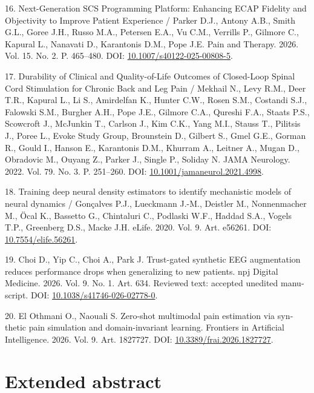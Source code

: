 \documentclass[12pt,a4paper]{article}
\begin{document}
\noindent\foreignlanguage{english}{16. Next-Generation SCS Programming Platform: Enhancing ECAP Fidelity and Objectivity to Improve Patient Experience / Parker D.J., Antony A.B., Smith G.L., Goree J.H., Russo M.A., Petersen E.A., Vu C.M., Verrills P., Gilmore C., Kapural L., Nanavati D., Karantonis D.M., Pope J.E. Pain and Therapy. 2026. Vol. 15. No. 2. P. 465–480. DOI: \url{10.1007/s40122-025-00808-5}.}\par
\noindent\foreignlanguage{english}{17. Durability of Clinical and Quality-of-Life Outcomes of Closed-Loop Spinal Cord Stimulation for Chronic Back and Leg Pain / Mekhail N., Levy R.M., Deer T.R., Kapural L., Li S., Amirdelfan K., Hunter C.W., Rosen S.M., Costandi S.J., Falowski S.M., Burgher A.H., Pope J.E., Gilmore C.A., Qureshi F.A., Staats P.S., Scowcroft J., McJunkin T., Carlson J., Kim C.K., Yang M.I., Stauss T., Pilitsis J., Poree L., Evoke Study Group, Brounstein D., Gilbert S., Gmel G.E., Gorman R., Gould I., Hanson E., Karantonis D.M., Khurram A., Leitner A., Mugan D., Obradovic M., Ouyang Z., Parker J., Single P., Soliday N. JAMA Neurology. 2022. Vol. 79. No. 3. P. 251–260. DOI: \url{10.1001/jamaneurol.2021.4998}.}\par
\noindent\foreignlanguage{english}{18. Training deep neural density estimators to identify mechanistic models of neural dynamics / Gonçalves P.J., Lueckmann J.-M., Deistler M., Nonnenmacher M., Öcal K., Bassetto G., Chintaluri C., Podlaski W.F., Haddad S.A., Vogels T.P., Greenberg D.S., Macke J.H. eLife. 2020. Vol. 9. Art. e56261. DOI: \url{10.7554/elife.56261}.}\par
\noindent\foreignlanguage{english}{19. Choi D., Yip C., Choi A., Park J. Trust-gated synthetic EEG augmentation reduces performance drops when generalizing to new patients. npj Digital Medicine. 2026. Vol. 9. No. 1. Art. 634. Reviewed text: accepted unedited manuscript. DOI: \url{10.1038/s41746-026-02778-0}.}\par
\noindent\foreignlanguage{english}{20. El Othmani O., Naouali S. Zero-shot multimodal pain estimation via synthetic pain simulation and domain-invariant learning. Frontiers in Artificial Intelligence. 2026. Vol. 9. Art. 1827727. DOI: \url{10.3389/frai.2026.1827727}.}\par
{}
\section*{Extended abstract}
\end{document}
